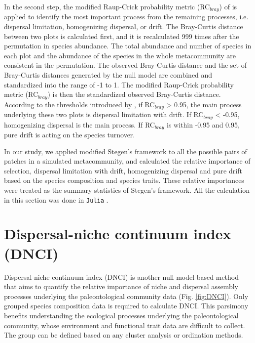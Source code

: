 	In the second step, the modified Raup-Crick probability metric (RC$_{bray}$) of \citet{chase2011disentangling} is applied to identify the most important process from the remaining processes, i.e. dispersal limitation, homogenizing dispersal, or drift. The Bray-Curtis distance between two plots is calculated first, and it is recalculated 999 times after the permutation in species abundance. The total abundance and number of species in each plot and the abundance of the species in the whole metacommunity are consistent in the permutation. The observed Bray-Curtis distance and the set of Bray-Curtis distances generated by the null model are combined and standardized into the range of -1 to 1. The modified Raup-Crick probability metric (RC$_{bray}$) is then the standardized observed Bray-Curtis distance. According to the thresholds introduced by \citet{chase2011disentangling}, if RC$_{bray}$ > 0.95, the main process underlying these two plots is dispersal limitation with drift. If RC$_{bray}$ < -0.95, homogenizing dispersal is the main process. If RC$_{bray}$ is within -0.95 and 0.95, pure drift is acting on the species turnover.
	
	In our study, we applied modified Stegen's framework to all the possible pairs of patches in a simulated metacommunity, and calculated the relative importance of selection, dispersal limitation with drift, homogenizing dispersal and pure drift based on the species composition and species traits. These relative importances were treated as the summary statistics of Stegen's framework. All the calculation in this section was done in \texttt{Julia} \citep{bezanson2017julia}.
	
	\section{Dispersal-niche continuum index (DNCI)}
	\noindent
	\label{sec:dnci}
	Dispersal-niche continuum index (DNCI) is another null model-based method that aims to quantify the relative importance of niche and dispersal assembly processes underlying the paleontological community data \citep{vilmi2021dispersal} (Fig. \ref{fig:DNCI}). Only grouped species composition data is required to calculate DNCI. This parsimony benefits understanding the ecological processes underlying the paleontological community, whose environment and functional trait data are difficult to collect. The group can be defined based on any cluster analysis or ordination methods.
	

